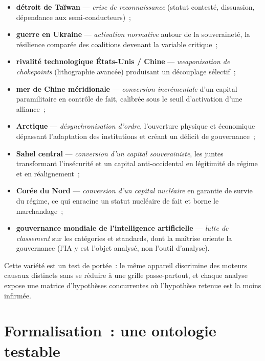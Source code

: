 \documentclass[11pt,a4paper]{article}
\begin{document}
\begin{itemize}[nosep]
  \item \textbf{détroit de Taïwan} --- \emph{crise de reconnaissance} (statut contesté,
  dissuasion, dépendance aux semi-conducteurs)~;
  \item \textbf{guerre en Ukraine} --- \emph{activation normative} autour de la souveraineté,
  la résilience comparée des coalitions devenant la variable critique~;
  \item \textbf{rivalité technologique États-Unis / Chine} --- \emph{weaponisation de
  chokepoints} (lithographie avancée) produisant un découplage sélectif~;
  \item \textbf{mer de Chine méridionale} --- \emph{conversion incrémentale} d'un capital
  paramilitaire en contrôle de fait, calibrée sous le seuil d'activation d'une alliance~;
  \item \textbf{Arctique} --- \emph{désynchronisation d'ordre}, l'ouverture physique et
  économique dépassant l'adaptation des institutions et créant un déficit de gouvernance~;
  \item \textbf{Sahel central} --- \emph{conversion d'un capital souverainiste}, les juntes
  transformant l'insécurité et un capital anti-occidental en légitimité de régime et en
  réalignement~;
  \item \textbf{Corée du Nord} --- \emph{conversion d'un capital nucléaire} en garantie de
  survie du régime, ce qui enracine un statut nucléaire de fait et borne le marchandage~;
  \item \textbf{gouvernance mondiale de l'intelligence artificielle} --- \emph{lutte de
  classement} sur les catégories et standards, dont la maîtrise oriente la gouvernance (l'IA y
  est l'objet analysé, non l'outil d'analyse).
\end{itemize}

Cette variété est un test de portée~: le même appareil discrimine des moteurs causaux distincts
sans se réduire à une grille passe-partout, et chaque analyse expose une matrice d'hypothèses
concurrentes où l'hypothèse retenue est la moins infirmée.

\section{Formalisation~: une ontologie testable}
\label{sec:ontologie}
\end{document}
